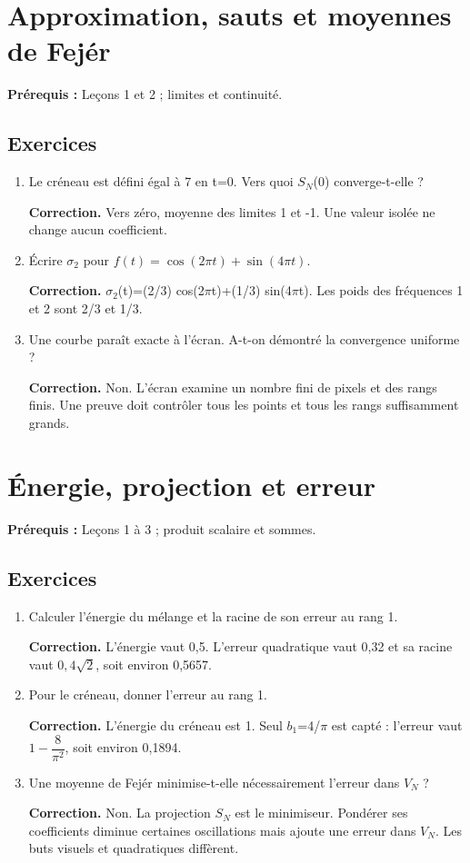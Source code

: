 \documentclass[11pt,a4paper]{article}
\begin{document}
\section{Approximation, sauts et moyennes de Fejér}
\textbf{Prérequis :} Leçons 1 et 2 ; limites et continuité.
\subsection*{Exercices}\begin{enumerate}
\item Le créneau est défini égal à 7 en t=0. Vers quoi $S_N$(0) converge-t-elle ?
\par\textbf{Correction.} Vers zéro, moyenne des limites 1 et -1. Une valeur isolée ne change aucun coefficient.
\item Écrire $\sigma_2$ pour $f(t)=\cos(2\pi t)+\sin(4\pi t)$.
\par\textbf{Correction.} $\sigma_2$(t)=(2/3) cos(2$\pi$t)+(1/3) sin(4$\pi$t). Les poids des fréquences 1 et 2 sont 2/3 et 1/3.
\item Une courbe paraît exacte à l’écran. A-t-on démontré la convergence uniforme ?
\par\textbf{Correction.} Non. L’écran examine un nombre fini de pixels et des rangs finis. Une preuve doit contrôler tous les points et tous les rangs suffisamment grands.
\end{enumerate}
\clearpage
\section{Énergie, projection et erreur}
\textbf{Prérequis :} Leçons 1 à 3 ; produit scalaire et sommes.
\subsection*{Exercices}\begin{enumerate}
\item Calculer l’énergie du mélange et la racine de son erreur au rang 1.
\par\textbf{Correction.} L’énergie vaut 0,5. L’erreur quadratique vaut 0,32 et sa racine vaut $0{,}4\sqrt2$, soit environ 0,5657.
\item Pour le créneau, donner l’erreur au rang 1.
\par\textbf{Correction.} L’énergie du créneau est 1. Seul $b_1$=4/$\pi$ est capté : l’erreur vaut $1-\dfrac8{\pi^2}$, soit environ 0,1894.
\item Une moyenne de Fejér minimise-t-elle nécessairement l’erreur dans $V_N$ ?
\par\textbf{Correction.} Non. La projection $S_N$ est le minimiseur. Pondérer ses coefficients diminue certaines oscillations mais ajoute une erreur dans $V_N$. Les buts visuels et quadratiques diffèrent.
\end{enumerate}
\clearpage
\end{document}
